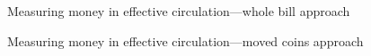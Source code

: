 \begin{frame}{Measuring money in effective circulation---whole bill approach}
	\begin{figure}[h]
		\centering
	\end{figure}
\end{frame}
%
\begin{frame}{Measuring money in effective circulation---moved coins approach}
	\begin{figure}[h]
		\centering
	\end{figure}
\end{frame}
%



